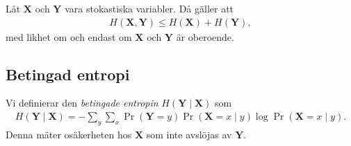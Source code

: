 \documentclass{beamer}
\let\stoch\mathbf{}
\begin{document}
\begin{frame}
  \begin{lemma}
    Låt \(\stoch X\) och \(\stoch Y\) vara stokastiska variabler.
    Då gäller att
    \begin{align*}
      H(\stoch X, \stoch Y)\leq H(\stoch X) + H(\stoch Y),
    \end{align*}
    med likhet om och endast om \(\stoch X\) och \(\stoch Y\) är oberoende.
  \end{lemma}
\end{frame}

%
%

\subsection{Betingad entropi}

\begin{frame}
  \begin{definition}
    Vi definierar den \emph{betingade entropin} \(H(\stoch Y\mid \stoch X)\) 
    som
    \begin{align*}
      H(\stoch Y\mid \stoch X) = %
        -\sum_y\sum_x \Pr(\stoch Y = y)\Pr(\stoch X = x\mid y)\log \Pr(\stoch 
        X = x\mid y).
    \end{align*}
    Denna mäter osäkerheten hos \(\stoch X\) som inte avslöjas av \(\stoch Y\).
  \end{definition}
\end{frame}
\end{document}
